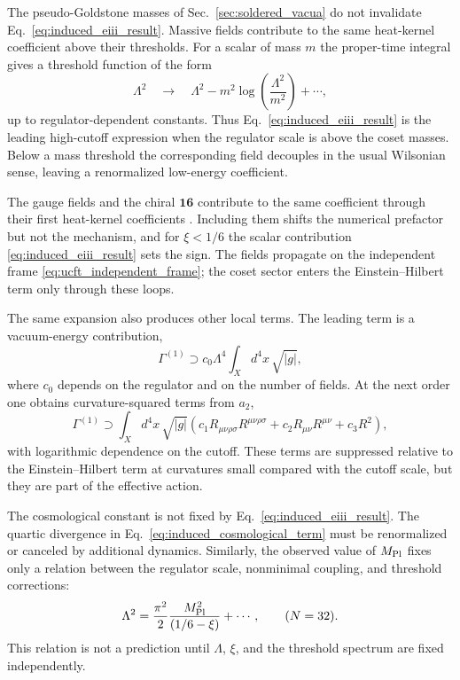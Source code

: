 \documentclass[aps,prd,preprint,longbibliography,nofootinbib,superscriptaddress,floatfix]{revtex4-2}
\begin{document}
The pseudo-Goldstone masses of Sec.~\ref{sec:soldered_vacua} do not invalidate
Eq.~\eqref{eq:induced_eiii_result}. Massive fields contribute to the same
heat-kernel coefficient above their thresholds. For a scalar of mass \(m\) the
proper-time integral gives a threshold function of the form
\begin{equation}
    \Lambda^2
    \quad\longrightarrow\quad
    \Lambda^2
    -
    m^2\log\!\left(\frac{\Lambda^2}{m^2}\right)
    +
    \cdots ,
    \label{eq:induced_mass_threshold}
\end{equation}
up to regulator-dependent constants. Thus Eq.~\eqref{eq:induced_eiii_result}
is the leading high-cutoff expression when the regulator scale is above the
coset masses. Below a mass threshold the corresponding field decouples in the
usual Wilsonian sense, leaving a renormalized low-energy coefficient.

The gauge fields and the chiral \(\mathbf{16}\) contribute to the same
coefficient through their first heat-kernel coefficients
\cite{GilkeyInvariance}. Including them shifts the numerical prefactor but not
the mechanism, and for \(\xi<1/6\) the scalar contribution
\eqref{eq:induced_eiii_result} sets the sign. The fields propagate on the
independent frame \eqref{eq:ucft_independent_frame}; the coset sector enters the
Einstein--Hilbert term only through these loops.

The same expansion also produces other local terms. The leading term is a
vacuum-energy contribution,
\begin{equation}
    \Gamma^{(1)}
    \supset
    c_0\Lambda^4
    \int_X d^4x\,\sqrt{|g|},
    \label{eq:induced_cosmological_term}
\end{equation}
where \(c_0\) depends on the regulator and on the number of fields. At the next
order one obtains curvature-squared terms from \(a_2\),
\begin{equation}
    \Gamma^{(1)}
    \supset
    \int_X d^4x\,\sqrt{|g|}
    \left(
        c_1 R_{\mu\nu\rho\sigma}R^{\mu\nu\rho\sigma}
        +
        c_2 R_{\mu\nu}R^{\mu\nu}
        +
        c_3 R^2
    \right),
    \label{eq:induced_curvature_squared}
\end{equation}
with logarithmic dependence on the cutoff. These terms are suppressed relative
to the Einstein--Hilbert term at curvatures small compared with the cutoff
scale, but they are part of the effective action.

The cosmological constant is not fixed by Eq.~\eqref{eq:induced_eiii_result}.
The quartic divergence in Eq.~\eqref{eq:induced_cosmological_term} must be
renormalized or canceled by additional dynamics. Similarly, the observed value
of \(M_{\rm Pl}\) fixes only a relation between the regulator scale,
nonminimal coupling, and threshold corrections:
\begin{equation}
    \Lambda^2
    =
    \frac{\pi^2}{2}
    \frac{M_{\rm Pl}^2}{(1/6-\xi)}
    +
    \cdots ,
    \qquad
    (N=32).
    \label{eq:induced_cutoff_relation}
\end{equation}
This relation is not a prediction until \(\Lambda\), \(\xi\), and the
threshold spectrum are fixed independently.
\end{document}
